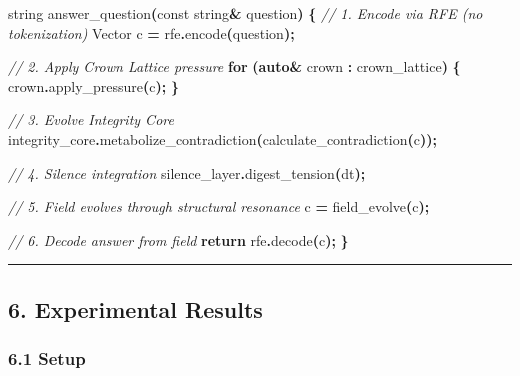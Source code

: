 \documentclass[
  11pt,
  a4paper,
]{article}
\newenvironment{Shaded}{\begin{snugshade}}{\end{snugshade}}
\newcommand{\AttributeTok}[1]{\textcolor[rgb]{0.13,0.29,0.53}{#1}}
\newcommand{\CommentTok}[1]{\textcolor[rgb]{0.56,0.35,0.01}{\textit{#1}}}
\newcommand{\ControlFlowTok}[1]{\textcolor[rgb]{0.13,0.29,0.53}{\textbf{#1}}}
\newcommand{\KeywordTok}[1]{\textcolor[rgb]{0.13,0.29,0.53}{\textbf{#1}}}
\newcommand{\NormalTok}[1]{#1}
\newcommand{\OperatorTok}[1]{\textcolor[rgb]{0.81,0.36,0.00}{\textbf{#1}}}
\begin{document}
\begin{Shaded}
\begin{Highlighting}[]
\NormalTok{string answer\_question}\OperatorTok{(}\AttributeTok{const}\NormalTok{ string}\OperatorTok{\&}\NormalTok{ question}\OperatorTok{)} \OperatorTok{\{}
    \CommentTok{// 1. Encode via RFE (no tokenization)}
\NormalTok{    Vector c }\OperatorTok{=}\NormalTok{ rfe}\OperatorTok{.}\NormalTok{encode}\OperatorTok{(}\NormalTok{question}\OperatorTok{);}
    
    \CommentTok{// 2. Apply Crown Lattice pressure}
    \ControlFlowTok{for} \OperatorTok{(}\KeywordTok{auto}\OperatorTok{\&}\NormalTok{ crown }\OperatorTok{:}\NormalTok{ crown\_lattice}\OperatorTok{)} \OperatorTok{\{}
\NormalTok{        crown}\OperatorTok{.}\NormalTok{apply\_pressure}\OperatorTok{(}\NormalTok{c}\OperatorTok{);}
    \OperatorTok{\}}
    
    \CommentTok{// 3. Evolve Integrity Core}
\NormalTok{    integrity\_core}\OperatorTok{.}\NormalTok{metabolize\_contradiction}\OperatorTok{(}\NormalTok{calculate\_contradiction}\OperatorTok{(}\NormalTok{c}\OperatorTok{));}
    
    \CommentTok{// 4. Silence integration}
\NormalTok{    silence\_layer}\OperatorTok{.}\NormalTok{digest\_tension}\OperatorTok{(}\NormalTok{dt}\OperatorTok{);}
    
    \CommentTok{// 5. Field evolves through structural resonance}
\NormalTok{    c }\OperatorTok{=}\NormalTok{ field\_evolve}\OperatorTok{(}\NormalTok{c}\OperatorTok{);}
    
    \CommentTok{// 6. Decode answer from field}
    \ControlFlowTok{return}\NormalTok{ rfe}\OperatorTok{.}\NormalTok{decode}\OperatorTok{(}\NormalTok{c}\OperatorTok{);}
\OperatorTok{\}}
\end{Highlighting}
\end{Shaded}

\begin{center}\rule{0.5\linewidth}{0.5pt}\end{center}

\subsection{6. Experimental Results}\label{experimental-results}

\subsubsection{6.1 Setup}\label{setup}
\end{document}

